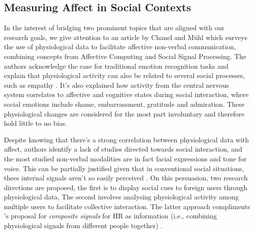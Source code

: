 \subsection{Measuring Affect in Social Contexts}
\label{lit_reivew:ssp}

In the interest of bridging two prominent topics that are aligned with our research goals, we give attention to an article by Chanel and Mühl \cite{chanel_connecting_2015} which surveys the use of physiological data to facilitate affective non-verbal communication, combining concepts from Affective Computing and Social Signal Processing. The authors acknowledge the case for traditional emotion recognition tasks and explain that physiological activity can also be related to several social processes, such as empathy \cite{levenson_empathy_1992}. It's also explained how activity from the central nervous system correlates to affective and cognitive states during social interaction, where social emotions include shame, embarrassment, gratitude and admiration. These physiological changes are considered for the most part involuntary and therefore hold little to no bias.

Despite knowing that there's a strong correlation between physiological data with affect, authors identify a lack of studies directed towards social interaction, and the most studied non-verbal modalities are in fact facial expressions and tone for voice. This can be partially justified given that in conventional social situations, thees internal signals aren't so easily perceived \cite{vinciarelli_social_2009}. On this persuasion, two research directions are proposed, the first is to display social cues to foreign users through physiological data, The second involves analysing physiological activity among multiple users to facilitate collective interaction. The latter approach compliments \citeauthor{slovak_understanding_2012}'s proposal for \textit{composite signals} for HR as information (i.e., combining physiological signals from different people together) \cite{slovak_understanding_2012}.



